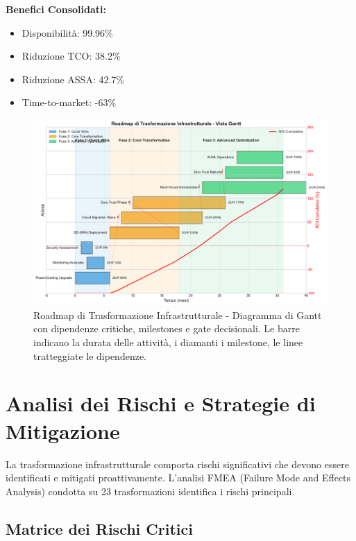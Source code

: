 \textbf{Benefici Consolidati:}
\begin{itemize}
    \item Disponibilità: 99.96\%
    \item Riduzione TCO: 38.2\%
    \item Riduzione ASSA: 42.7\%
    \item Time-to-market: -63\%
\end{itemize}

\begin{figure}[htbp]
\centering
\includegraphics[width=1\textwidth]{thesis_figures/cap3/figura_3_4_roadmap.pdf}
\caption{Roadmap di Trasformazione Infrastrutturale - Diagramma di Gantt con dipendenze critiche, milestones e gate decisionali. Le barre indicano la durata delle attività, i diamanti i milestone, le linee tratteggiate le dipendenze.}
\label{fig:roadmap_transformation}
\end{figure}

\section{\texorpdfstring{Analisi dei Rischi e Strategie di Mitigazione}{3.7 - Analisi dei Rischi e Strategie di Mitigazione}}

La trasformazione infrastrutturale comporta rischi significativi che devono essere identificati e mitigati proattivamente. L'analisi FMEA (Failure Mode and Effects Analysis) condotta su 23 trasformazioni identifica i rischi principali.

\subsection{\texorpdfstring{Matrice dei Rischi Critici}{3.7.1 - Matrice dei Rischi Critici}}

